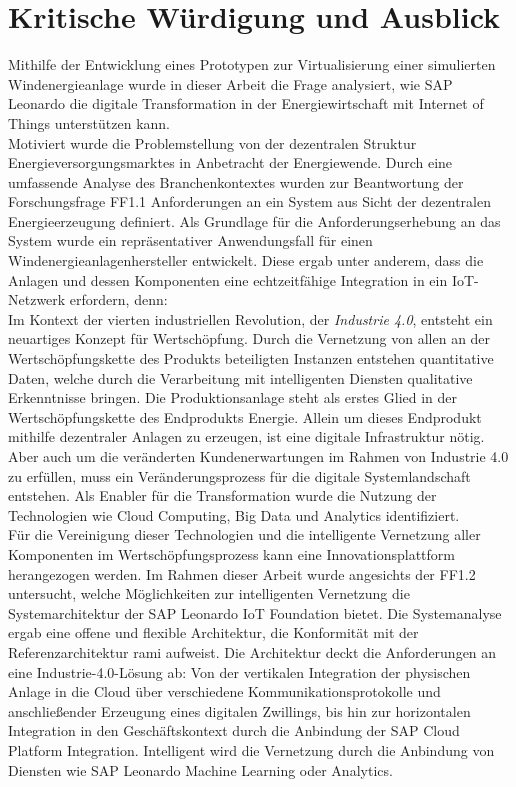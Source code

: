 \section{Kritische Würdigung und Ausblick}

Mithilfe der Entwicklung eines Prototypen zur Virtualisierung einer simulierten Windenergieanlage wurde in dieser Arbeit die Frage analysiert, wie SAP Leonardo die digitale Transformation in der Energiewirtschaft mit Internet of Things unterstützen kann. 
\\Motiviert wurde die Problemstellung von der dezentralen Struktur Energieversorgungsmarktes in Anbetracht der Energiewende. Durch eine umfassende Analyse des Branchenkontextes wurden zur Beantwortung der Forschungsfrage FF1.1 Anforderungen an ein System aus Sicht der dezentralen Energieerzeugung definiert. Als Grundlage für die Anforderungserhebung an das System wurde ein repräsentativer Anwendungsfall für einen Windenergieanlagenhersteller entwickelt. Diese ergab unter anderem, dass die Anlagen und dessen Komponenten eine echtzeitfähige Integration in ein IoT-Netzwerk erfordern, denn:
\\Im Kontext der vierten industriellen Revolution, der \textit{Industrie 4.0}, entsteht ein neuartiges Konzept für Wertschöpfung. Durch die Vernetzung von allen an der Wertschöpfungskette des Produkts beteiligten Instanzen entstehen quantitative Daten, welche durch die Verarbeitung mit intelligenten Diensten qualitative Erkenntnisse bringen. Die Produktionsanlage steht als erstes Glied in der Wertschöpfungskette des Endprodukts Energie. Allein um dieses Endprodukt mithilfe dezentraler Anlagen zu erzeugen, ist eine digitale Infrastruktur nötig. Aber auch um die veränderten Kundenerwartungen im Rahmen von Industrie 4.0 zu erfüllen, muss ein Veränderungsprozess für die digitale Systemlandschaft entstehen. Als Enabler für die Transformation wurde die Nutzung der Technologien wie Cloud Computing, Big Data und Analytics identifiziert. 
\\Für die Vereinigung dieser Technologien und die intelligente Vernetzung aller Komponenten im Wertschöpfungsprozess kann eine Innovationsplattform herangezogen werden. Im Rahmen dieser Arbeit wurde angesichts der FF1.2 untersucht, welche Möglichkeiten zur intelligenten Vernetzung die Systemarchitektur der SAP Leonardo IoT Foundation bietet. Die Systemanalyse ergab eine offene und flexible Architektur, die Konformität mit der Referenzarchitektur \ac{rami} aufweist. Die Architektur deckt die Anforderungen an eine Industrie-4.0-Lösung ab: Von der vertikalen Integration der physischen Anlage in die Cloud über verschiedene Kommunikationsprotokolle und anschließender Erzeugung eines digitalen Zwillings, bis hin zur horizontalen Integration in den Geschäftskontext durch die Anbindung der SAP Cloud Platform Integration. Intelligent wird die Vernetzung durch die Anbindung von Diensten wie SAP Leonardo Machine Learning oder Analytics. 
